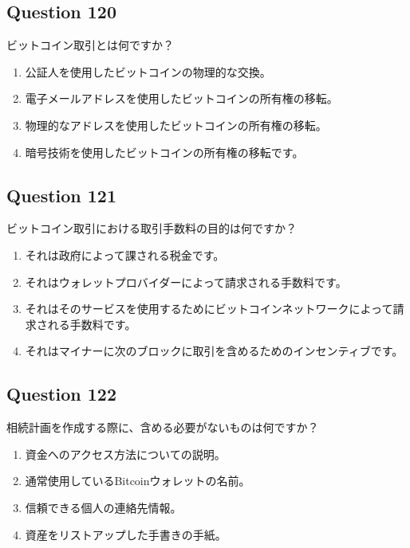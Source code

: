 \documentclass[12pt,a4paper]{article}
\begin{document}
\bigskip


\subsection*{Question 120}
ビットコイン取引とは何ですか？

\begin{enumerate}[label=\Alph*., leftmargin=*]
\item 公証人を使用したビットコインの物理的な交換。
\item 電子メールアドレスを使用したビットコインの所有権の移転。
\item 物理的なアドレスを使用したビットコインの所有権の移転。
\item 暗号技術を使用したビットコインの所有権の移転です。
\end{enumerate}

\bigskip


\subsection*{Question 121}
ビットコイン取引における取引手数料の目的は何ですか？

\begin{enumerate}[label=\Alph*., leftmargin=*]
\item それは政府によって課される税金です。
\item それはウォレットプロバイダーによって請求される手数料です。
\item それはそのサービスを使用するためにビットコインネットワークによって請求される手数料です。
\item それはマイナーに次のブロックに取引を含めるためのインセンティブです。
\end{enumerate}

\bigskip


\subsection*{Question 122}
相続計画を作成する際に、含める必要がないものは何ですか？

\begin{enumerate}[label=\Alph*., leftmargin=*]
\item 資金へのアクセス方法についての説明。
\item 通常使用しているBitcoinウォレットの名前。
\item 信頼できる個人の連絡先情報。
\item 資産をリストアップした手書きの手紙。
\end{enumerate}
\end{document}
